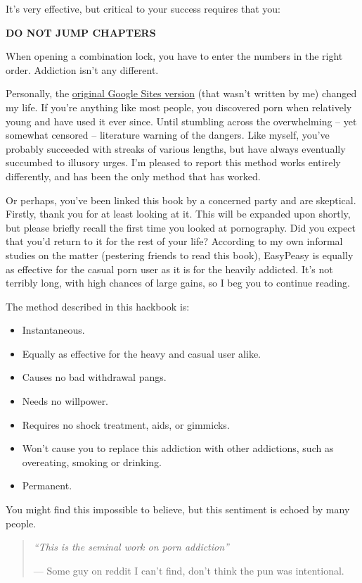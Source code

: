 \documentclass[
]{book}
\begin{document}
It's very effective, but critical to your success requires that you:

{\textbf{DO NOT JUMP CHAPTERS}}

When opening a combination lock, you have to enter the numbers in the right order. Addiction isn't any different.

Personally, the \href{https://sites.google.com/site/hackbookeasypeasy}{original Google Sites version} (that wasn't written by me) changed my life. If you're anything like most people, you discovered porn when relatively young and have used it ever since. Until stumbling across the overwhelming -- yet somewhat censored -- literature warning of the dangers. Like myself, you've probably succeeded with streaks of various lengths, but have always eventually succumbed to illusory urges. I'm pleased to report this method works entirely differently, and has been the only method that has worked.

Or perhaps, you've been linked this book by a concerned party and are skeptical. Firstly, thank you for at least looking at it. This will be expanded upon shortly, but please briefly recall the first time you looked at pornography. Did you expect that you'd return to it for the rest of your life? According to my own informal studies on the matter (pestering friends to read this book), EasyPeasy is equally as effective for the casual porn user as it is for the heavily addicted. It's not terribly long, with high chances of large gains, so I beg you to continue reading.

The method described in this hackbook is:

\begin{itemize}
\item
  Instantaneous.
\item
  Equally as effective for the heavy and casual user alike.
\item
  Causes no bad withdrawal pangs.
\item
  Needs no willpower.
\item
  Requires no shock treatment, aids, or gimmicks.
\item
  Won't cause you to replace this addiction with other addictions, such as overeating, smoking or drinking.
\item
  Permanent.
\end{itemize}

You might find this impossible to believe, but this sentiment is echoed by many people.

\begin{quote}
\emph{``This is the seminal work on porn addiction''}

--- Some guy on reddit I can't find, don't think the pun was intentional.
\end{quote}
\end{document}
